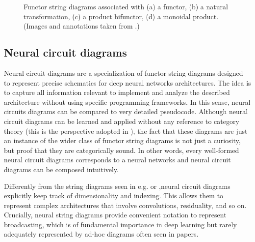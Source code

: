 \documentclass[11pt,a4paper,openright,twoside]{report}
\theoremstyle{plain}
\theoremstyle{definition}
\begin{document}
\begin{figure}[h]
\begin{center}
\begin{subfigure}{0.6\textwidth}
      \caption{}
    \end{subfigure}         
    \caption[Functor string diagrams]{Functor string diagrams associated with (a) a functor, (b) a natural transformation, (c) a product bifunctor, (d) a monoidal product. (Images and annotations taken from \cite{abbott2024functor}.)}
    \label{fig: functorstringdiagrams}
  \end{center}
\end{figure}

\subsection{Neural circuit diagrams}

Neural circuit diagrams are a specialization of functor string diagrams designed to represent precise schematics for deep neural networks architectures. The idea is to capture all information relevant to implement and analyze the described architecture without using specific programming frameworks. In this sense, neural circuits diagrams can be compared to very detailed pseudocode. Although neural circuit diagrams can be learned and applied without any reference to category theory (this is the perspective adopted in \cite{abbott2024neural}), the fact that these diagrams are just an instance of the wider class of functor string diagrams is not just a curiosity, but proof that they are categorically sound. In other words, every well-formed neural circuit diagrams corresponds to a neural networks and neural circuit diagrams can be composed intuitively.

Differently from the string diagrams seen in e.g. \cite{gavranovic2024fundamental} or \cite{wilson2022categories},neural circuit diagrams explicitly keep track of dimensionality and indexing. This allows them to represent complex architectures that involve convolutions, residuality, and so on. Crucially, neural string diagrams provide convenient notation to represent broadcasting, which is of fundamental importance in deep learning but rarely adequately represented by ad-hoc diagrams often seen in papers. 
\end{document}
